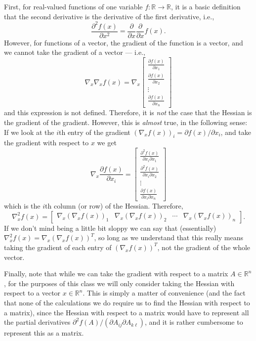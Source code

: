\documentclass[12pt]{article}
\begin{document}
First, for real-valued functions of one variable $f:\mathbb{R}
  \rightarrow \mathbb{R}$, it is a basic definition that the second
  derivative is the derivative of the first derivative, i.e.,
\[\frac{\partial^2 f(x)}{\partial x^2} = \frac{\partial}{\partial x}
  \frac{\partial}{\partial x} f(x).\]
However, for functions of a vector, the gradient of the function is a
vector, and we cannot take the gradient of a vector --- i.e.,
\[\nabla_x \nabla_x f(x) = \nabla_x \left [ \begin{array}{c} \frac{\partial
  f(x)}{\partial x_1} \\ \frac{\partial f(x)}{\partial x_2} \\ \vdots
  \\ \frac{\partial f(x)}{\partial x_n}\end{array} \right ]\]
and this expression is not defined.  Therefore, it is \textit{not} the
  case that the Hessian is the gradient of the gradient.  However,
  this is \textit{almost} true, in the following sense:  If we look at
  the $i$th entry of the gradient $(\nabla_x f(x))_i = \partial f(x) /
  \partial x_i$, and take the gradient with respect to $x$ we get
\[\nabla_x \frac{\partial f(x)}{\partial x_i} = \left [
  \begin{array}{c} \frac{\partial^2 f(x)}{\partial x_i \partial x_1}
  \\ \frac{\partial^2 f(x)}{\partial x_i \partial x_2} \\ \vdots \\
  \frac{\partial f(x)}{\partial x_i \partial x_n}\end{array} \right ] \]
which is the $i$th column (or row) of the Hessian.  Therefore,
\[\nabla_x^2 f(x) = \left [ \begin{array}{cccc} \nabla_x (\nabla_x
  f(x))_1 & \nabla_x (\nabla_x f(x))_2 & 
    \cdots & \nabla_x (\nabla_x f(x))_n \end{array} \right ].\]
If we don't mind being a little bit sloppy we can say that
(essentially) $\nabla_x^2 f(x) = \nabla_x (\nabla_x f(x))^T$, so long
as we understand that this really means taking the gradient of each
entry of $(\nabla_x f(x))^T$, not the gradient of the whole vector.

Finally, note that while we can take the gradient with respect to a
matrix $A \in \mathbb{R}^n$, for the purposes of this class we will
only consider taking the Hessian with respect to a vector $x \in
\mathbb{R}^n$.  This is simply a matter of convenience (and the fact
that none of the calculations we do require us to find the Hessian
with respect to a matrix), since the Hessian with respect to a matrix
would have to represent all the partial derivatives $\partial^2 f(A) /
(\partial A_{ij} \partial A_{k\ell})$, and it is rather cumbersome to
represent this as a matrix.
\end{document}

